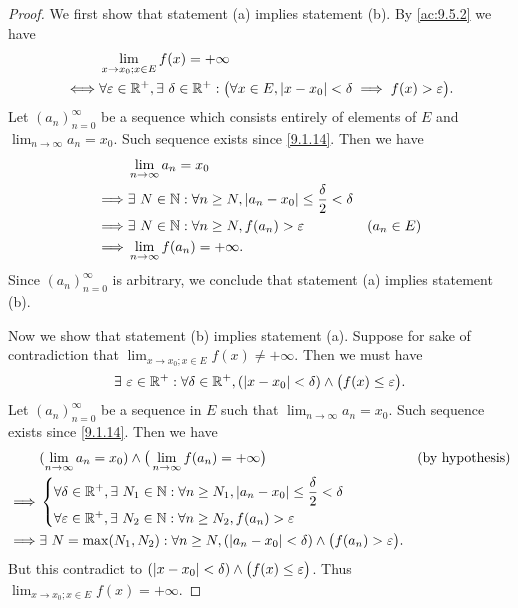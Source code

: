 \begin{proof}
  We first show that statement (a) implies statement (b).
  By \cref{ac:9.5.2} we have
  \begin{align*}
         & \lim_{x \to x_0 ; x \in E} f(x) = +\infty                                                                                               \\
    \iff & \forall \varepsilon \in \mathbb{R}^+, \exists\ \delta \in \mathbb{R}^+ : \big(\forall x \in E, \left\lvert x - x_0\right\rvert < \delta \implies f(x) > \varepsilon\big).
  \end{align*}
  Let \((a_n)_{n = 0}^\infty\) be a sequence which consists entirely of elements of \(E\) and \(\lim_{n \to \infty} a_n = x_0\).
  Such sequence exists since \cref{9.1.14}.
  Then we have
  \begin{align*}
             & \lim_{n \to \infty} a_n = x_0                                                                       \\
    \implies & \exists\ N \in \mathbb{N} : \forall n \geq N, \left\lvert a_n - x_0\right\rvert \leq \dfrac{\delta}{2} < \delta               \\
    \implies & \exists\ N \in \mathbb{N} : \forall n \geq N, f(a_n) > \varepsilon                            & (a_n \in E) \\
    \implies & \lim_{n \to \infty} f(a_n) = +\infty.
  \end{align*}
  Since \((a_n)_{n = 0}^\infty\) is arbitrary, we conclude that statement (a) implies statement (b).

  Now we show that statement (b) implies statement (a).
  Suppose for sake of contradiction that \(\lim_{x \to x_0 ; x \in E} f(x) \neq +\infty\).
  Then we must have
  \[
    \exists\ \varepsilon \in \mathbb{R}^+ : \forall \delta \in \mathbb{R}^+, (\left\lvert x - x_0\right\rvert < \delta) \land \big(f(x) \leq \varepsilon\big).
  \]
  Let \((a_n)_{n = 0}^\infty\) be a sequence in \(E\) such that \(\lim_{n \to \infty} a_n = x_0\).
  Such sequence exists since \cref{9.1.14}.
  Then we have
  \begin{align*}
             & (\lim_{n \to \infty} a_n = x_0) \land \big(\lim_{n \to \infty} f(a_n) = +\infty\big)                                  &  & \text{(by hypothesis)} \\
    \implies & \begin{dcases}
                 \forall \delta \in \mathbb{R}^+, \exists\ N_1 \in \mathbb{N} : \forall n \geq N_1, \left\lvert a_n - x_0\right\rvert \leq \dfrac{\delta}{2} < \delta \\
                 \forall \varepsilon \in \mathbb{R}^+, \exists\ N_2 \in \mathbb{N} : \forall n \geq N_2, f(a_n) > \varepsilon
               \end{dcases}                                \\
    \implies & \exists\ N = \max(N_1, N_2) : \forall n \geq N, (\left\lvert a_n - x_0\right\rvert < \delta) \land \big(f(a_n) > \varepsilon\big).
  \end{align*}
  But this contradict to \((\left\lvert x - x_0\right\rvert < \delta) \land \big(f(x) \leq \varepsilon\big)\).
  Thus \(\lim_{x \to x_0 ; x \in E} f(x) = +\infty\).
\end{proof}

